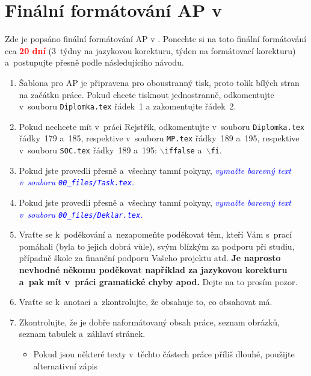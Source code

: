 ﻿\chapter{Finální formátování AP v~\LaTeXe \label{ch:Manual_final}}



Zde je popsáno finální formátování AP v \LaTeXe. Ponechte si na toto finální for\-má\-to\-vá\-ní cca \textcolor{red}{\textbf{20 dní}} (3~týdny na jazykovou korekturu, týden na formátovací korekturu) a~postupujte přesně podle následujícího návodu.

\begin{enumerate}
    \item Šablona pro AP je připravena pro oboustranný tisk, proto tolik bílých stran na začátku práce. Pokud chcete tisknout jednostranně, odkomentujte v~souboru {\rm \texttt{Diplomka.tex}} řádek~1 a zakomentujte řádek~2.
    \item Pokud nechcete mít v~práci Rejstřík, odkomentujte v~souboru {\rm \texttt{Diplomka.tex}} řádky~179 a~185, respektive v~souboru \texttt{MP.tex} řádky~189 a~195, respektive v~souboru \texttt{SOC.tex} řádky~189 a~195\?: $\backslash$\texttt{iffalse} a~$\backslash$\texttt{fi}.
    \item Pokud jste provedli přesně a~všechny tamní pokyny, \textcolor{blue}{\em vymažte barevný text v~souboru \newline \texttt{00\_files/Task.tex}.}
    \item Pokud jste provedli přesně a~všechny tamní pokyny, \textcolor{blue}{\em vymažte barevný text v~souboru \newline \texttt{00\_files/Deklar.tex}.}
    \item Vraťte se k~poděkování a~nezapomeňte poděkovat těm, kteří Vám s~prací pomáhali (byla to jejich dobrá vůle), svým blízkým za podporu při studiu, případně škole za finanční podporu Vašeho projektu atd. \textbf{Je naprosto nevhodné někomu poděkovat například za jazykovou korekturu a~pak mít v~práci gramatické chyby apod.} Dejte na to prosím pozor.
    \item Vraťte se k~anotaci a~zkontrolujte, že obsahuje to, co obsahovat má.
    \item Zkontrolujte, že je dobře naformátovaný obsah práce, seznam obrázků, seznam tabulek a~záhlaví stránek.
    \begin{itemize}
        \item Pokud jsou některé texty v~těchto částech práce příliš dlouhé, použijte alternativní zápis
            \begin{center}

\end{center}
\end{itemize}
\end{enumerate}
